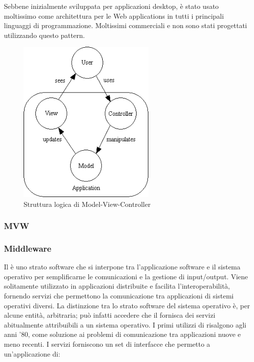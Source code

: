 Sebbene inizialmente sviluppata per applicazioni desktop,  è stato usato moltissimo come architettura per le Web applications in tutti i principali linguaggi di programmazione. Moltissimi  commerciali e non sono stati progettati utilizzando questo pattern.

\begin{figure}[h]
\centering \includegraphics[width=0.6\textwidth]{patterns/mvc.png}
\caption{Struttura logica di Model-View-Controller}
\end{figure}

\subsubsection{MVW}

\subsubsection{Middleware} 
Il  è uno strato software che si interpone tra l'applicazione software e il sistema operativo per semplificarne le comunicazioni e la gestione di input/output. Viene solitamente utilizzato in applicazioni distribuite e facilita l'interoperabilità, fornendo servizi che permettono la comunicazione tra applicazioni di sistemi operativi diversi. La distinzione tra lo strato software del sistema operativo è, per alcune entità, arbitraria; può infatti accedere che il  fornisca dei servizi abitualmente attribuibili a un sistema operativo. I primi utilizzi di  risalgono agli anni '80, come soluzione ai problemi di comunicazione tra applicazioni nuove e meno recenti. I servizi  forniscono un set di interfacce che permetto a un'applicazione di:
	
